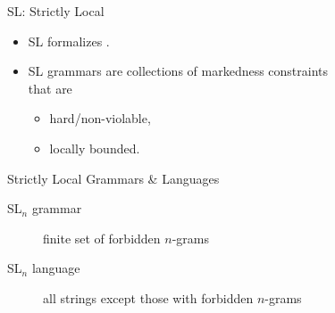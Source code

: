 \documentclass[xcolor={usenames,svgnames,x11names,table}]{beamer}
\begin{document}
\begin{frame}{SL: Strictly Local}
    \begin{itemize}
        \item SL formalizes .
        \item SL grammars are collections of markedness constraints\\
            that are
            \begin{itemize}
                \item hard\slash non-violable,
                \item locally bounded.
            \end{itemize}
    \end{itemize}

    \begin{block}{Strictly Local Grammars \& Languages}
        \begin{description}
            \item[SL$_n$ grammar] finite set of forbidden $n$-grams
            \item[SL$_n$ language] all strings except those with forbidden $n$-grams
        \end{description}
    \end{block}
\end{frame}
\end{document}
